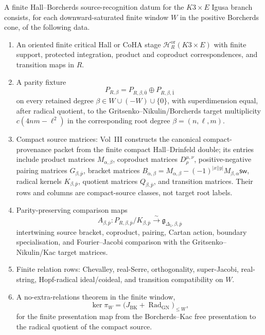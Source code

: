 \begin{definition}
\label{def:hgf-finite-hall-borcherds-source}
A finite Hall--Borcherds source-recognition datum for the
$K3\times E$ Igusa branch consists, for each downward-saturated finite
window $W$ in the positive Borcherds cone, of the following data.
\begin{enumerate}[label=\textup{(\roman*)}]
\item An oriented finite critical Hall or CoHA stage
$\mathcal H^{\mathrm{or}}_R(K3\times E)$ with finite support,
protected integration, product and coproduct correspondences, and
transition maps in $R$.
\item A parity fixture
\[
P_{R,\beta}=P_{R,\beta,\bar0}\oplus P_{R,\beta,\bar1}
\]
on every retained degree $\beta\in W\cup(-W)\cup\{0\}$, with
superdimension equal, after radical quotient, to the
Gritsenko--Nikulin/Borcherds target multiplicity
$c(4nm-\ell^2)$ in the corresponding root degree
$\beta=(n,\ell,m)$.
\item Compact source matrices: Vol~III constructs the canonical
compact-provenance packet from the finite compact Hall--Drinfeld
double; its entries include product matrices $M_{\alpha,\beta}$,
coproduct matrices $D^{\mu,\nu}_{\rho}$, positive-negative pairing
matrices $G_{\beta,\bar p}$, bracket matrices
$B_{\alpha,\beta}=M_{\alpha,\beta}
-(-1)^{|x||y|}M_{\beta,\alpha}\mathsf{sw}$, radical kernels
$K_{\beta,\bar p}$, quotient matrices $Q_{\beta,\bar p}$, and
transition matrices. Their rows and columns are compact-source
classes, not target root labels.
\item Parity-preserving comparison maps
\[
A_{\beta,\bar p}\colon
P_{R,\beta,\bar p}/K_{\beta,\bar p}
\xrightarrow{\ \sim\ }
\mathfrak g_{\Delta_5,\beta,\bar p}
\]
intertwining source bracket, coproduct, pairing, Cartan action,
boundary specialisation, and Fourier--Jacobi comparison with the
Gritsenko--Nikulin/Kac target matrices.
\item Finite relation rows: Chevalley, real-Serre, orthogonality,
super-Jacobi, real-string, Hopf-radical ideal/coideal, and transition
compatibility on $W$.
\item A no-extra-relations theorem in the finite window,
\[
\ker\pi_W=
\bigl(J_{\mathrm{BK}}+\operatorname{Rad}_{\mathrm{GN}}\bigr)_{\le W},
\]
for the finite presentation map from the Borcherds--Kac free
presentation to the radical quotient of the compact source.

\end{enumerate}
\end{definition}
